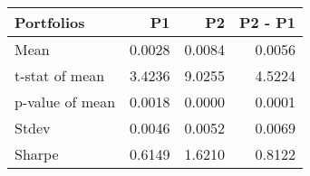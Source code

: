 \begin{tabular}{lrrr}
\toprule
Portfolios & P1 & P2 & P2 - P1 \\
\midrule
Mean & 0.0028 & 0.0084 & 0.0056 \\
t-stat of mean & 3.4236 & 9.0255 & 4.5224 \\
p-value of mean & 0.0018 & 0.0000 & 0.0001 \\
Stdev & 0.0046 & 0.0052 & 0.0069 \\
Sharpe & 0.6149 & 1.6210 & 0.8122 \\
\bottomrule
\end{tabular}
